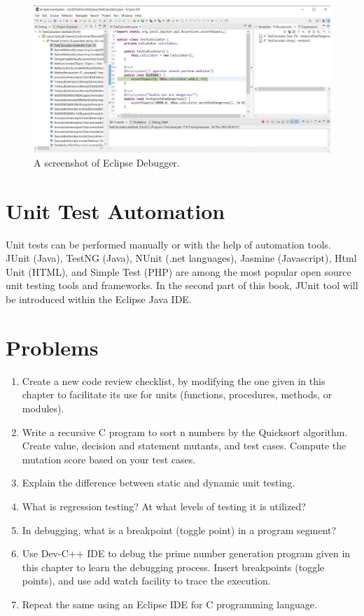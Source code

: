 \begin{figure}[!ht]
    \includegraphics{images/eclipse-debugger-screenshot.jpg}
    \caption{A screenshot of Eclipse Debugger.}
\end{figure}

\section{Unit Test Automation}
Unit tests can be performed manually or with the help of automation tools. JUnit (Java), TestNG (Java), NUnit (.net languages), Jasmine (Javascript), Html Unit (HTML), and Simple Test (PHP) are among the most popular open source unit testing tools and frameworks. In the second part of this book, JUnit tool will be introduced within the Eclipse Java IDE.  

\section{Problems}
\begin{enumerate}
    \item Create a new code review checklist, by modifying the one given in this chapter to facilitate its use for units (functions, procedures, methods, or modules). 
    \item Write a recursive C program to sort n numbers by the Quicksort algorithm. Create value, decision and statement mutants, and test cases. Compute the mutation score based on your test cases.  
    \item Explain the difference between static and dynamic unit testing.
    \item What is regression testing? At what levels of testing it is utilized?
    \item In debugging, what is a breakpoint (toggle point) in a program segment?
    \item Use Dev-C++ IDE to debug the prime number generation program given in this chapter to learn the debugging process. Insert breakpoints (toggle points), and use add watch facility to trace the execution.
    \item Repeat the same using an Eclipse IDE for C programming language.
\end{enumerate}